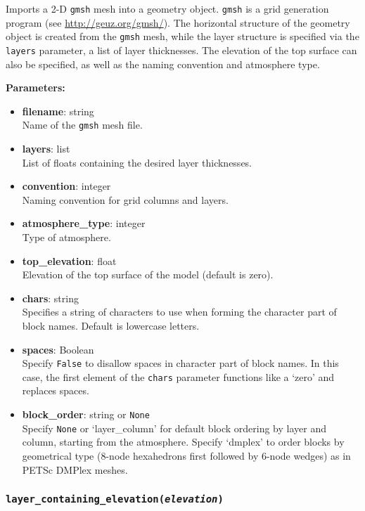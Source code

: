 Imports a 2-D \texttt{gmsh} mesh into a geometry object.  \texttt{gmsh} is a grid generation program (see \url{http://geuz.org/gmsh/}).  The horizontal structure of the geometry object is created from the \texttt{gmsh} mesh, while the layer structure is specified via the \texttt{layers} parameter, a list of layer thicknesses.  The elevation of the top surface can also be specified, as well as the naming convention and atmosphere type.

\textbf{Parameters:}
\begin{itemize}
\item \textbf{filename}: string\\
  Name of the \texttt{gmsh} mesh file.
\item \textbf{layers}: list\\
  List of floats containing the desired layer thicknesses.
\item \textbf{convention}: integer\\
  Naming convention for grid columns and layers.
\item \textbf{atmosphere\_type}: integer\\
  Type of atmosphere.
\item \textbf{top\_elevation}: float\\
  Elevation of the top surface of the model (default is zero).
\item \textbf{chars}: string\\
  Specifies a string of characters to use when forming the character part of block names.  Default is lowercase letters.
\item \textbf{spaces}: Boolean\\
  Specify \texttt{False} to disallow spaces in character part of block names. In this case, the first element of the \texttt{chars} parameter functions like a `zero' and replaces spaces.
\item \textbf{block\_order}: string or \texttt{None}\\
  Specify \texttt{None} or `layer\_column' for default block ordering by layer and column, starting from the atmosphere. Specify `dmplex' to order blocks by geometrical type (8-node hexahedrons first followed by 6-node wedges) as in PETSc DMPlex meshes.
\end{itemize}

\begin{snugshade}\subsubsection{\texttt{layer\_containing\_elevation(\emph{elevation})}}\end{snugshade}
\label{sec:mulgrid:layer_containing_elevation}

